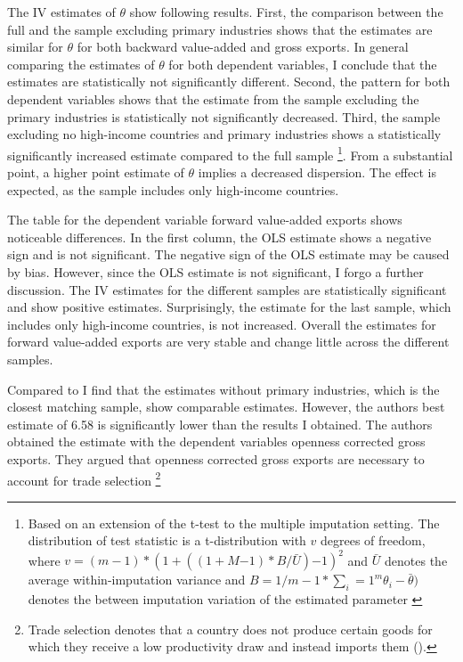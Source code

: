  \par
The IV estimates of $\theta$  show following results.
 First, the comparison between the full and the sample excluding primary industries shows that the estimates are similar for $\theta$ for both backward value-added and gross exports.
 In general comparing the estimates of $\theta$ for both dependent variables, I conclude that the estimates are statistically not significantly different.
 Second, the pattern for both dependent variables shows that the estimate from the sample excluding the primary industries is statistically not significantly decreased.
 Third, the sample excluding no high-income countries and primary industries shows a statistically significantly increased estimate compared to the full sample \footnote{Based on an extension of the t-test to the multiple imputation setting.
  The distribution of test statistic is a t-distribution with $v$ degrees of freedom, where $v=(m-1)*(1+ ((1+M{-1})*B/ \bar{U}){-1})^2$ and $\bar{U}$ denotes the average within-imputation variance and $B= 1/m-1*\sum_i=1^m \theta_i-\bar{\theta})$ denotes the between imputation variation of the estimated parameter \textcite[p.77]{Rubin1987}}.
From a substantial point, a higher point estimate of $\theta$ implies a decreased dispersion.
The effect is expected, as the sample includes only high-income countries.\par
The table for the dependent variable forward value-added exports shows noticeable differences.
In the first column, the OLS estimate shows a negative sign and is not significant.
The negative sign of the OLS estimate may be caused by bias.
However, since the OLS estimate is not significant, I forgo a further discussion.
The IV estimates for the different samples are statistically significant and show positive estimates.
Surprisingly, the estimate for the last sample, which includes only high-income countries, is not increased.
Overall the estimates for forward value-added exports are very stable and change little across the different samples.
  \par
  Compared to \textcite{costinot} I find that the estimates without primary industries, which is the closest matching sample, show comparable estimates.%
   However, the authors best estimate of 6.58 is significantly lower than the results I obtained.
   The authors obtained the estimate with the dependent variables openness corrected gross exports.
  They argued that openness corrected gross exports are necessary to account for trade selection \footnote{ Trade selection denotes that a country does not produce certain goods for which they receive a low productivity draw and instead imports them (\cite{costinot}).}
